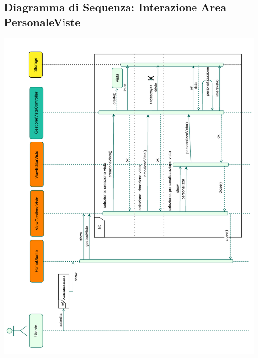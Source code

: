 \vspace{2cm}
\subsection*{Diagramma di Sequenza: Interazione Area Personale\-Viste}
{}
\begin{adjustwidth}{-1.5cm}{0cm}
\includegraphics[scale=0.9]{progettazione/Diagramma-Sequenza-Interazione-Viste.drawio.pdf}
\end{adjustwidth}
\vspace{0.5cm}


